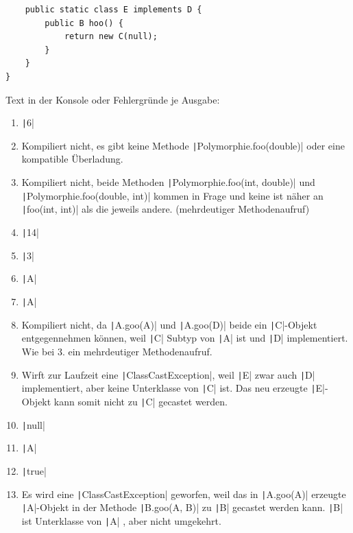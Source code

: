 \documentclass[11pt]{exam} %
\newcommand{\code}[1]{\texttt|#1|}
\begin{document}
\begin{questions}
\begin{verbatim}
	public static class E implements D {
		public B hoo() {
			return new C(null);
		}
	}
}
\end{verbatim}
\begin{solution}
Text in der Konsole oder Fehlergründe je Ausgabe:\par\nobreak
\begin{enumerate}
\item \code{6}\par
\item Kompiliert nicht, es gibt keine Methode \code{Polymorphie.foo(double)} oder eine kompatible Überladung.\par
\item Kompiliert nicht, beide Methoden \code{Polymorphie.foo(int, double)} und \newline\code{Polymorphie.foo(double, int)} kommen in Frage und keine ist näher an \newline\code{foo(int, int)} als die jeweils andere. (mehrdeutiger Methodenaufruf)\par
\item \code{14}\par
\item \code{3}\par
\item \code{A}\par
\item \code{A}\par
\item Kompiliert nicht, da \code{A.goo(A)} und \code{A.goo(D)} beide ein \code{C}-Objekt entgegennehmen können, weil \code{C} Subtyp von \code{A} ist und \code{D} implementiert. Wie bei 3. ein mehrdeutiger Methodenaufruf.\par
\item Wirft zur Laufzeit eine \code{ClassCastException}, weil \code{E} zwar auch \code{D} implementiert, aber keine Unterklasse von \code{C} ist. Das neu erzeugte \code{E}-Objekt kann somit nicht zu \code{C} gecastet werden.
\item \code{null}\par
\item \code{A}\par
\item \code{true}\par
\item Es wird eine \code{ClassCastException} geworfen, weil das in \code{A.goo(A)} erzeugte \code{A}-Objekt in der Methode \code{B.goo(A, B)} zu \code{B} gecastet werden kann. \code{B} ist Unterklasse von \code{A} , aber nicht umgekehrt.

\end{enumerate}
\end{solution}
\end{questions}
\end{document}
